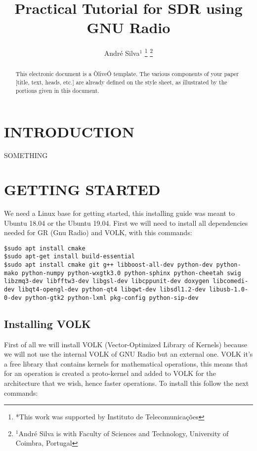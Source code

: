 \documentclass[a4paper, 10pt, conference]{ieeeconf}      %
\title{\LARGE \bf
Practical Tutorial for SDR using GNU Radio
}
\author{André Silva$^{1}$
\thanks{*This work was supported by Instituto de Telecomunicações}%
\thanks{$^{1}$André Silva is with Faculty of Sciences and Technology,
        University of Coimbra, Portugal}
}
\begin{document}
\maketitle
\thispagestyle{empty}
\pagestyle{empty}


\begin{abstract}

This electronic document is a ÒliveÓ template. The various components of your paper [title, text, heads, etc.] are already defined on the style sheet, as illustrated by the portions given in this document.

\end{abstract}


\section{INTRODUCTION}

SOMETHING

\section{GETTING STARTED}
We need a Linux base for getting started, this installing guide was meant to Ubuntu 18.04 or the Ubuntu 19.04. First we will need to install all dependencies needed for GR (Gnu Radio) and VOLK, with this commands:

\begin{lstlisting}[breaklines]
$sudo apt install cmake
$sudo apt-get install build-essential
$sudo apt install cmake git g++ libboost-all-dev python-dev python-mako python-numpy python-wxgtk3.0 python-sphinx python-cheetah swig libzmq3-dev libfftw3-dev libgsl-dev libcppunit-dev doxygen libcomedi-dev libqt4-opengl-dev python-qt4 libqwt-dev libsdl1.2-dev libusb-1.0-0-dev python-gtk2 python-lxml pkg-config python-sip-dev
\end{lstlisting}

\subsection{Installing VOLK}
First of all we will install VOLK (Vector-Optimized Library of Kernels) because we will not use the internal VOLK of GNU Radio but an external one. VOLK it's a free library that contains kernels for mathematical operations, this means that for an operation is created a proto-kernel and added to VOLK for the architecture that we wish, hence faster operations. To install this follow the next commands:
\end{document}
